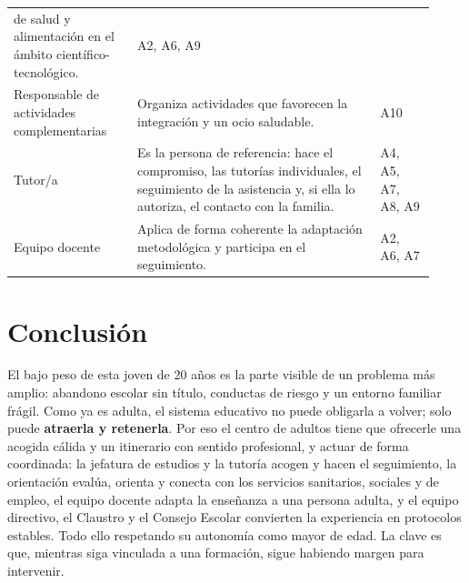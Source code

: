 \documentclass[11pt,a4paper]{article}
\begin{document}
{\begin{longtable}{>{\raggedright\arraybackslash}p{0.27\linewidth} p{0.53\linewidth} >{\centering\arraybackslash}p{0.12\linewidth}}
de salud y alimentación en el ámbito científico-tecnológico. & A2, A6, A9 \\
Responsable de actividades complementarias & Organiza actividades que
favorecen la integración y un ocio saludable. & A10 \\
Tutor/a & Es la persona de referencia: hace el compromiso, las tutorías
individuales, el seguimiento de la asistencia y, si ella lo autoriza, el
contacto con la familia. & A4, A5, A7, A8, A9 \\
Equipo docente & Aplica de forma coherente la adaptación metodológica y
participa en el seguimiento. & A2, A6, A7 \\
\bottomrule
\end{longtable}
}

\section{Conclusión}
El bajo peso de esta joven de 20 años es la parte visible de un problema más
amplio: abandono escolar sin título, conductas de riesgo y un entorno familiar
frágil. Como ya es adulta, el sistema educativo no puede obligarla a volver;
solo puede \textbf{atraerla y retenerla}. Por eso el centro de adultos tiene
que ofrecerle una acogida cálida y un itinerario con sentido profesional, y
actuar de forma coordinada: la jefatura de estudios y la tutoría acogen y hacen
el seguimiento, la orientación evalúa, orienta y conecta con los servicios
sanitarios, sociales y de empleo, el equipo docente adapta la enseñanza a una
persona adulta, y el equipo directivo, el Claustro y el Consejo Escolar
convierten la experiencia en protocolos estables. Todo ello respetando su
autonomía como mayor de edad. La clave es que, mientras siga vinculada a una
formación, sigue habiendo margen para intervenir.
\end{document}
